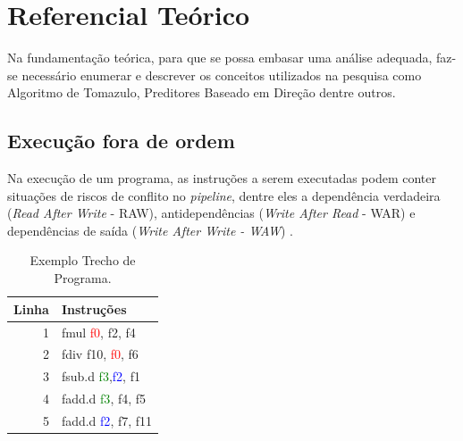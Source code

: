 \documentclass[12pt]{article}
\begin{document}
\section{Referencial Teórico} \label{sec:refteorico}

Na fundamentação teórica, para que se possa embasar uma análise adequada, faz-se necessário enumerar e descrever os conceitos utilizados na pesquisa como Algoritmo de Tomazulo, Preditores Baseado em Direção dentre outros.

\subsection{Execução fora de ordem}

Na execução de um programa, as instruções a serem executadas podem conter situações de riscos de conflito no \textit{pipeline}, dentre eles a dependência verdadeira (\textit{Read After Write} - RAW), antidependências (\textit{Write After Read} - WAR) e dependências de saída (\textit{Write After Write - WAW}) \cite{hennessy:2019}.

\begin{table}[h!]
  \begin{center}
    \caption{Exemplo Trecho de Programa.}
    \label{tab_programa_exe_1}
    \begin{tabular}{r|l}
      \textbf{Linha} & \textbf{Instruções}                                   \\
      \hline
      1              & fmul \textcolor{red}{f0}, f2, f4                      \\
      2              & fdiv f10, \textcolor{red}{f0}, f6                     \\
      3              & fsub.d \textcolor{green}{f3},\textcolor{blue}{f2}, f1 \\
      4              & fadd.d \textcolor{green}{f3}, f4, f5                  \\
      5              & fadd.d \textcolor{blue}{f2}, f7, f11                  \\
    \end{tabular}
  \end{center}
\end{table}
\end{document}
